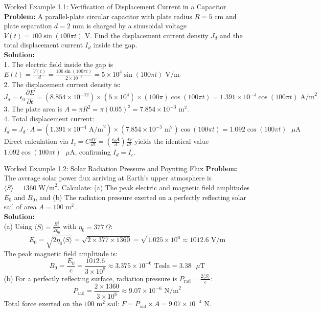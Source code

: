\begin{examplebox}{Worked Example 1.1: Verification of Displacement Current in a Capacitor}
\textbf{Problem:} A parallel-plate circular capacitor with plate radius $R = 5\text{ cm}$ and plate separation $d = 2\text{ mm}$ is charged by a sinusoidal voltage $V(t) = 100\sin(100\pi t)\text{ V}$. Find the displacement current density $J_d$ and the total displacement current $I_d$ inside the gap.\\
\textbf{Solution:}\\
1. The electric field inside the gap is $E(t) = \frac{V(t)}{d} = \frac{100\sin(100\pi t)}{2 \times 10^{-3}} = 5 \times 10^4 \sin(100\pi t)\text{ V/m}$.\\
2. The displacement current density is:
\[
J_d = \epsilon_0 \frac{\partial E}{\partial t} = (8.854 \times 10^{-12}) \times (5 \times 10^4) \times (100\pi)\cos(100\pi t) = 1.391 \times 10^{-4}\cos(100\pi t)\text{ A/m}^2
\]
3. The plate area is $A = \pi R^2 = \pi (0.05)^2 = 7.854 \times 10^{-3}\text{ m}^2$.\\
4. Total displacement current:
\[
I_d = J_d \cdot A = (1.391 \times 10^{-4}\text{ A/m}^2) \times (7.854 \times 10^{-3}\text{ m}^2)\cos(100\pi t) = 1.092\cos(100\pi t)\text{ }\mu\text{A}
\]
Direct calculation via $I_c = C\frac{dV}{dt} = \left(\frac{\epsilon_0 A}{d}\right)\frac{dV}{dt}$ yields the identical value $1.092\cos(100\pi t)\text{ }\mu\text{A}$, confirming $I_d = I_c$.
\end{examplebox}

\begin{examplebox}{Worked Example 1.2: Solar Radiation Pressure and Poynting Flux}
\textbf{Problem:} The average solar power flux arriving at Earth's upper atmosphere is $\langle S \rangle = 1360\text{ W/m}^2$. Calculate: (a) The peak electric and magnetic field amplitudes $E_0$ and $B_0$, and (b) The radiation pressure exerted on a perfectly reflecting solar sail of area $A = 100\text{ m}^2$.\\
\textbf{Solution:}\\
(a) Using $\langle S \rangle = \frac{E_0^2}{2\eta_0}$ with $\eta_0 = 377\,\Omega$:
\[
E_0 = \sqrt{2 \eta_0 \langle S \rangle} = \sqrt{2 \times 377 \times 1360} = \sqrt{1.025 \times 10^6} \approx 1012.6\text{ V/m}
\]
The peak magnetic field amplitude is:
\[
B_0 = \frac{E_0}{c} = \frac{1012.6}{3 \times 10^8} \approx 3.375 \times 10^{-6}\text{ Tesla} = 3.38\text{ }\mu\text{T}
\]
(b) For a perfectly reflecting surface, radiation pressure is $P_{\text{rad}} = \frac{2\langle S \rangle}{c}$:
\[
P_{\text{rad}} = \frac{2 \times 1360}{3 \times 10^8} \approx 9.07 \times 10^{-6}\text{ N/m}^2
\]
Total force exerted on the $100\text{ m}^2$ sail: $F = P_{\text{rad}} \times A = 9.07 \times 10^{-4}\text{ N}$.
\end{examplebox}

